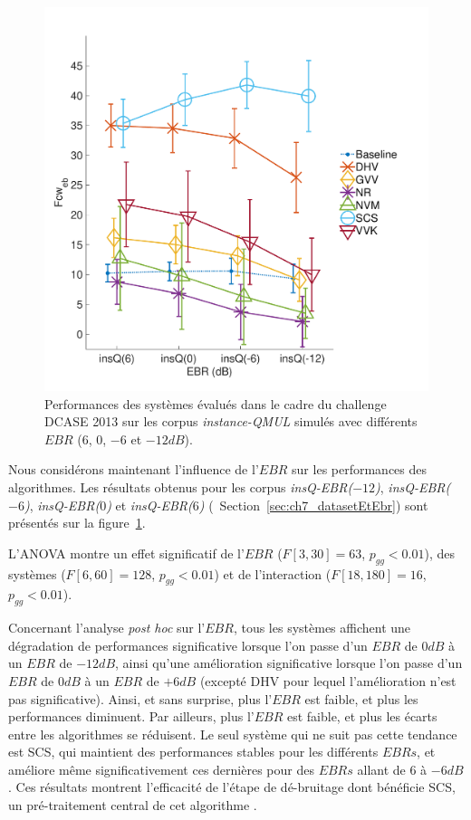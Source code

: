 \begin{figure}[t]
\begin{center}
\includegraphics[width=1\columnwidth]{gfx/ch_7/dcase2013_2}
\caption{Performances des systèmes évalués dans le cadre du challenge DCASE 2013 sur les corpus \emph{instance-QMUL} simulés avec différents $EBR$ ($6$, $0$, $-6$ et $-12dB$).}
\label{fig:ebr} 
\end{center}
\end{figure}

Nous considérons maintenant l'influence de l'$EBR$ sur les performances des algorithmes. Les résultats obtenus pour les corpus \emph{insQ-EBR($-12$)}, \emph{insQ-EBR($-6$)}, \emph{insQ-EBR($0$)} et \emph{insQ-EBR($6$)} (\cf~Section~\ref{sec:ch7_datasetEtEbr}) sont présentés sur la figure~\ref{fig:ebr}. 

L'ANOVA montre un effet significatif de l'$EBR$ ($F[3,30]=63$, $p_{gg}<0.01$), des systèmes ($F[6,60]=128$, $p_{gg}<0.01$) et de l'interaction ($F[18,180]=16$, $p_{gg}<0.01$).

Concernant l'analyse \emph{post hoc} sur l'$EBR$, tous les systèmes affichent une dégradation de performances significative lorsque l'on passe d'un $EBR$ de $0dB$ à un $EBR$ de $-12dB$, ainsi qu'une amélioration significative lorsque l'on passe d'un $EBR$ de $0dB$ à un $EBR$ de $+6dB$ (excepté DHV pour lequel l'amélioration n'est pas significative). Ainsi, et sans surprise, plus l'$EBR$ est faible, et plus les performances diminuent. Par ailleurs, plus l'$EBR$ est faible, et plus les écarts entre les algorithmes se réduisent. Le seul système qui ne suit pas cette tendance est SCS, qui maintient des performances stables pour les différents $EBRs$, et améliore même significativement ces dernières pour des $EBRs$ allant de $6$ à $-6dB$. Ces résultats montrent l'efficacité de l'étape de dé-bruitage dont bénéficie SCS, un pré-traitement central de cet algorithme \citep{SCS}. \\

